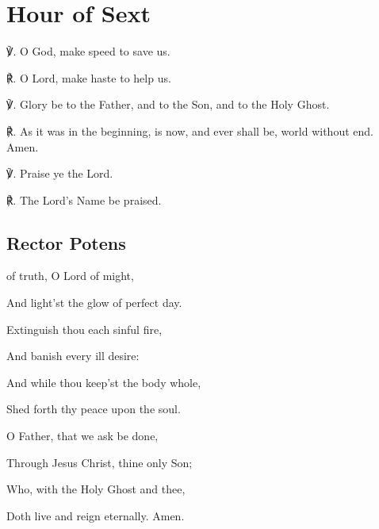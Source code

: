 \fancyhead[RE,LO]{}
\section{Hour of Sext}

\begin{multicols}{2}

℣. O God, {} make speed to save us.

℟. O Lord, make haste to help us.

℣. Glory be to the Father, and to the Son, and to the Holy Ghost.

℟. As it was in the beginning, is now, and ever shall be, world without end. Amen.

℣. Praise ye the Lord.

℟. The Lord's Name be praised.

\subsection{Rector Potens}
\begin{hangparas}{1.25em}{1}
 of truth, O Lord of might,\par
{}
\par\noindent
{}\par\noindent
And light'st the glow of perfect day.\\
\par\noindent
Extinguish thou each sinful fire,\par\noindent
And banish every ill desire:\par\noindent
And while thou keep'st the body whole,\par\noindent
Shed forth thy peace upon the soul.\\
\par\noindent
O Father, that we ask be done,\par\noindent
Through Jesus Christ, thine only Son;\par\noindent
Who, with the Holy Ghost and thee,\par\noindent
Doth live and reign eternally. Amen.\\
\end{hangparas}


\end{multicols}

